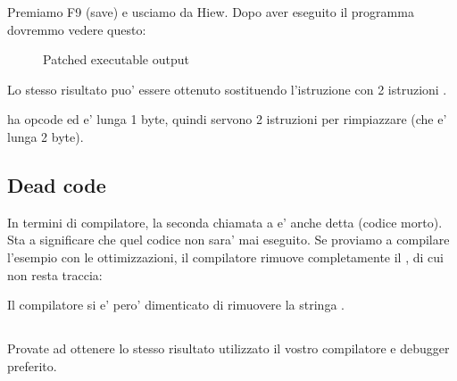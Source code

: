 Premiamo F9 (save) e usciamo da Hiew. Dopo aver eseguito il programma dovremmo vedere questo:

\begin{figure}[H]
\centering
{}
\caption{Patched executable output}
\label{fig:goto_result}
\end{figure}

Lo stesso risultato puo' essere ottenuto sostituendo l'istruzione \JMP con 2 istruzioni \NOP.

\NOP ha opcode  ed e' lunga 1 byte, quindi servono 2 istruzioni per rimpiazzare \JMP (che e' lunga 2 byte).

\subsection{Dead code}

In termini di compilatore, la seconda chiamata a \printf e' anche detta  (codice morto).
Sta a significare che quel codice non sara' mai eseguito. Se proviamo a compilare l'esempio con le ottimizzazioni, il compilatore
rimuove completamente il , di cui non resta traccia:



Il compilatore si e' pero' dimenticato di rimuovere la stringa .


\subsection{\Exercise}


Provate ad ottenere lo stesso risultato utilizzato il vostro compilatore e debugger preferito.
